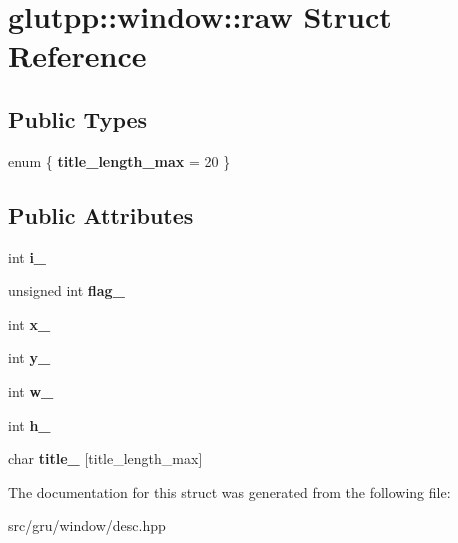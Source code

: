 \hypertarget{structglutpp_1_1window_1_1raw}{\section{glutpp\-:\-:window\-:\-:raw \-Struct \-Reference}
\label{structglutpp_1_1window_1_1raw}
}
\subsection*{\-Public \-Types}
\begin{DoxyCompactItemize}
\item 
enum \{ {\bfseries title\-\_\-length\-\_\-max} =  20
 \}
\end{DoxyCompactItemize}
\subsection*{\-Public \-Attributes}
\begin{DoxyCompactItemize}
\item 
\hypertarget{structglutpp_1_1window_1_1raw_a4eeade94ec87dac019770270b37e09cd}{int {\bfseries i\-\_\-}}\label{structglutpp_1_1window_1_1raw_a4eeade94ec87dac019770270b37e09cd}

\item 
\hypertarget{structglutpp_1_1window_1_1raw_a08dced0e44c01ffc43985a36d66ac443}{unsigned int {\bfseries flag\-\_\-}}\label{structglutpp_1_1window_1_1raw_a08dced0e44c01ffc43985a36d66ac443}

\item 
\hypertarget{structglutpp_1_1window_1_1raw_a5ff2d0bdc904fb0a8a93ce6d616a02a6}{int {\bfseries x\-\_\-}}\label{structglutpp_1_1window_1_1raw_a5ff2d0bdc904fb0a8a93ce6d616a02a6}

\item 
\hypertarget{structglutpp_1_1window_1_1raw_a0298cead68c6d669c952e0d5bce4b84c}{int {\bfseries y\-\_\-}}\label{structglutpp_1_1window_1_1raw_a0298cead68c6d669c952e0d5bce4b84c}

\item 
\hypertarget{structglutpp_1_1window_1_1raw_a428737c50c97c5049c1d1ac462d9a69c}{int {\bfseries w\-\_\-}}\label{structglutpp_1_1window_1_1raw_a428737c50c97c5049c1d1ac462d9a69c}

\item 
\hypertarget{structglutpp_1_1window_1_1raw_ac11000f6c34cd873e31cd3a8156b4605}{int {\bfseries h\-\_\-}}\label{structglutpp_1_1window_1_1raw_ac11000f6c34cd873e31cd3a8156b4605}

\item 
\hypertarget{structglutpp_1_1window_1_1raw_a690b3838d8d79cda813abd808fab53a3}{char {\bfseries title\-\_\-} \mbox{[}title\-\_\-length\-\_\-max\mbox{]}}\label{structglutpp_1_1window_1_1raw_a690b3838d8d79cda813abd808fab53a3}

\end{DoxyCompactItemize}


\-The documentation for this struct was generated from the following file\-:\begin{DoxyCompactItemize}
\item 
src/gru/window/desc.\-hpp\end{DoxyCompactItemize}
